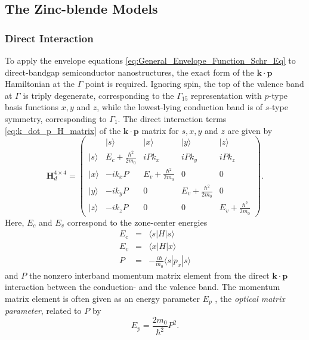 \subsection{The Zinc-blende Models}


\subsubsection{Direct Interaction}

To apply the envelope equations \ref{eq:General_Envelope_Function_Schr_Eq}
to direct-bandgap semiconductor nanostructures, the exact form of
the $\mathbf{k}\cdot\mathbf{p}$ Hamiltonian at the $\Gamma$ point
is required. Ignoring spin, the top of the valence band at $\Gamma$
is triply degenerate, corresponding to the $\Gamma_{15}$ representation
with $p$-type basis functions $x,y$ and $z$, while the lowest-lying
conduction band is of $s$-type symmetry, corresponding to $\Gamma_{1}$.
The direct interaction terms \ref{eq:k_dot_p_H_matrix} of the $\mathbf{k}\cdot\mathbf{p}$
matrix for $s,x,y$ and $z$ are given by \citet{kane_handbooksemiconductors_1982}\begin{equation}
\mathbf{H}_{d}^{4\times4}=\left(\begin{array}{r|lccc}
 & |s\rangle & |x\rangle & |y\rangle & |z\rangle\\
\hline |s\rangle & E_{c}+\frac{\hbar^{2}}{2m_{0}} & iPk_{x} & iPk_{y} & iPk_{z}\\
|x\rangle & -ik_{x}P & E_{v}+\frac{\hbar^{2}}{2m_{0}} & 0 & 0\\
|y\rangle & -ik_{y}P & 0 & E_{v}+\frac{\hbar^{2}}{2m_{0}} & 0\\
|z\rangle & -ik_{z}P & 0 & 0 & E_{v}+\frac{\hbar^{2}}{2m_{0}}\end{array}\right).\label{eq:Direct_Int_Matrix}\end{equation}
Here, $E_{c}$ and $E_{v}$ correspond to the zone-center energies\begin{eqnarray}
E_{c} & = & \langle s|H|s\rangle\\
E_{v} & = & \langle x|H|x\rangle\label{eq:Valence_Band_Edge_Energy}\\
P & = & -\frac{i\hbar}{m_{0}}\langle s|p_{x}|s\rangle\end{eqnarray}
and $P$ the nonzero interband momentum matrix element from the direct
$\mathbf{k}\cdot\mathbf{p}$ interaction between the conduction- and
the valence band. The momentum matrix element is often given as an
energy parameter $E_{p}$ , the \emph{optical matrix parameter}, related
to $P$ by\begin{equation}
E_{p}=\frac{2m_{0}}{\hbar^{2}}P^{2}.\end{equation}
